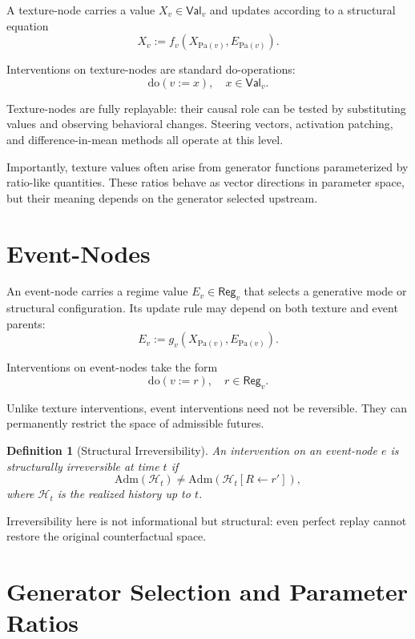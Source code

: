 \documentclass[11pt]{article}
\newtheorem{definition}{Definition}
\newcommand{\Hist}{\mathcal{H}}
\newcommand{\Adm}{\mathrm{Adm}}
\newcommand{\Reg}{\mathsf{Reg}}
\newcommand{\Val}{\mathsf{Val}}
\newcommand{\Do}{\mathrm{do}}
\begin{document}
A texture-node carries a value $X_v \in \Val_v$ and updates according to a
structural equation
\[
X_v := f_v(X_{\mathrm{Pa}(v)}, E_{\mathrm{Pa}(v)}).
\]

Interventions on texture-nodes are standard do-operations:
\[
\Do(v := x), \quad x \in \Val_v.
\]

Texture-nodes are fully replayable: their causal role can be tested by substituting
values and observing behavioral changes. Steering vectors, activation patching,
and difference-in-mean methods all operate at this level.

Importantly, texture values often arise from generator functions parameterized by
ratio-like quantities. These ratios behave as vector directions in parameter
space, but their meaning depends on the generator selected upstream.

\section{Event-Nodes}

An event-node carries a regime value $E_v \in \Reg_v$ that selects a generative
mode or structural configuration. Its update rule may depend on both texture and
event parents:
\[
E_v := g_v(X_{\mathrm{Pa}(v)}, E_{\mathrm{Pa}(v)}).
\]

Interventions on event-nodes take the form
\[
\Do(v := r), \quad r \in \Reg_v.
\]

Unlike texture interventions, event interventions need not be reversible. They
can permanently restrict the space of admissible futures.

\begin{definition}[Structural Irreversibility]
An intervention on an event-node $e$ is structurally irreversible at time $t$ if
\[
\Adm(\Hist_t) \neq \Adm(\Hist_t[R \leftarrow r']),
\]
where $\Hist_t$ is the realized history up to $t$.
\end{definition}

Irreversibility here is not informational but structural: even perfect replay
cannot restore the original counterfactual space.

\section{Generator Selection and Parameter Ratios}
\end{document}
